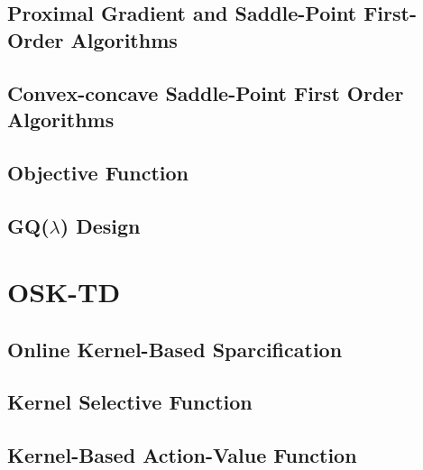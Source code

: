 \documentclass[conference]{IEEEtran}
\begin{document}
\subsection{Proximal Gradient and Saddle-Point First-Order Algorithms}
\subsection{Convex-concave Saddle-Point First Order Algorithms}
\subsection{Objective Function}
\subsection{GQ($\lambda$) Design}
\section{OSK-TD}
\subsection{Online Kernel-Based Sparcification}
\subsection{Kernel Selective Function}
\subsection{Kernel-Based Action-Value Function}




%
%
\end{document}
